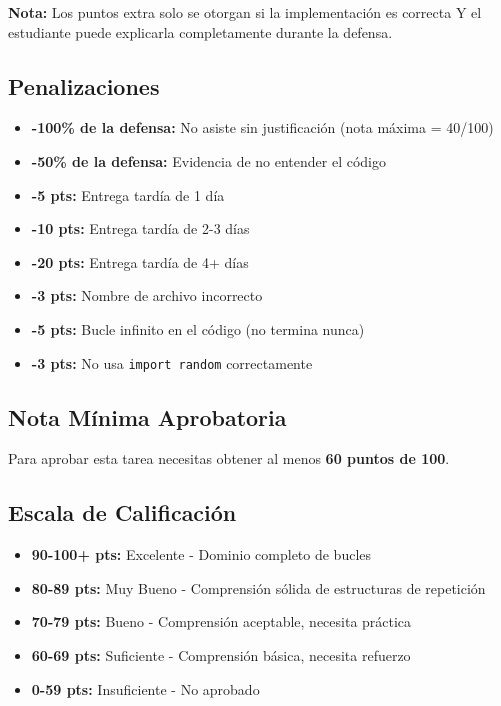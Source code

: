 \documentclass[12pt,a4paper]{article}
\begin{document}
\textbf{Nota:} Los puntos extra solo se otorgan si la implementación es correcta Y el estudiante puede explicarla completamente durante la defensa.

\subsection{Penalizaciones}

\begin{itemize}[leftmargin=*]
    \item \textbf{-100\% de la defensa:} No asiste sin justificación (nota máxima = 40/100)
    \item \textbf{-50\% de la defensa:} Evidencia de no entender el código
    \item \textbf{-5 pts:} Entrega tardía de 1 día
    \item \textbf{-10 pts:} Entrega tardía de 2-3 días
    \item \textbf{-20 pts:} Entrega tardía de 4+ días
    \item \textbf{-3 pts:} Nombre de archivo incorrecto
    \item \textbf{-5 pts:} Bucle infinito en el código (no termina nunca)
    \item \textbf{-3 pts:} No usa \texttt{import random} correctamente
\end{itemize}

\subsection{Nota Mínima Aprobatoria}

Para aprobar esta tarea necesitas obtener al menos \textbf{60 puntos de 100}.

\subsection{Escala de Calificación}

\begin{itemize}
    \item \textbf{90-100+ pts:} Excelente - Dominio completo de bucles
    \item \textbf{80-89 pts:} Muy Bueno - Comprensión sólida de estructuras de repetición
    \item \textbf{70-79 pts:} Bueno - Comprensión aceptable, necesita práctica
    \item \textbf{60-69 pts:} Suficiente - Comprensión básica, necesita refuerzo
    \item \textbf{0-59 pts:} Insuficiente - No aprobado
\end{itemize}
\end{document}

